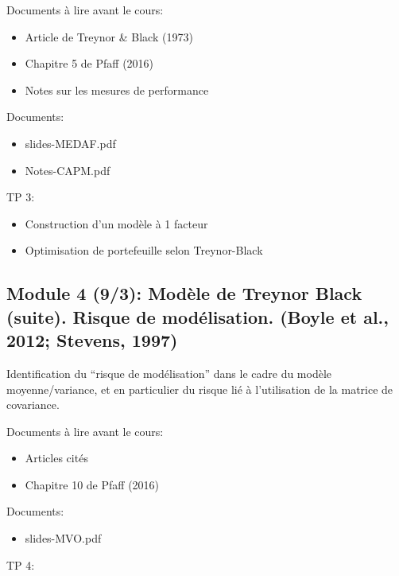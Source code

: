 \documentclass[
  11pt,
]{article}
\providecommand{\tightlist}{%
  \setlength{\itemsep}{0pt}\setlength{\parskip}{0pt}}
\begin{document}
Documents à lire avant le cours:

\begin{itemize}
\tightlist
\item
  Article de Treynor \& Black (1973)
\item
  Chapitre 5 de Pfaff (2016)
\item
  Notes sur les mesures de performance
\end{itemize}

Documents:

\begin{itemize}
\tightlist
\item
  slides-MEDAF.pdf
\item
  Notes-CAPM.pdf
\end{itemize}

TP 3:

\begin{itemize}
\tightlist
\item
  Construction d'un modèle à 1 facteur
\item
  Optimisation de portefeuille selon Treynor-Black
\end{itemize}

\hypertarget{module-4-93-moduxe8le-de-treynor-black-suite.-risque-de-moduxe9lisation.-boyle2012-ste1997}{%
\subsection{Module 4 (9/3): Modèle de Treynor Black (suite). Risque de
modélisation. (Boyle et al., 2012; Stevens,
1997)}\label{module-4-93-moduxe8le-de-treynor-black-suite.-risque-de-moduxe9lisation.-boyle2012-ste1997}}

Identification du ``risque de modélisation'' dans le cadre du modèle
moyenne/variance, et en particulier du risque lié à l'utilisation de la
matrice de covariance.

Documents à lire avant le cours:

\begin{itemize}
\tightlist
\item
  Articles cités
\item
  Chapitre 10 de Pfaff (2016)
\end{itemize}

Documents:

\begin{itemize}
\tightlist
\item
  slides-MVO.pdf
\end{itemize}

TP 4:
\end{document}
